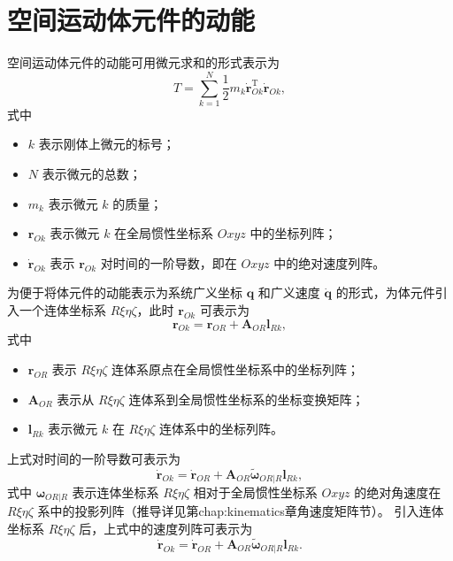 \section{空间运动体元件的动能}
空间运动体元件的动能可用微元求和的形式表示为
\[
T = \sum_{k=1}^{N} \frac{1}{2} m_k \dot{\boldsymbol{r}}_{Ok}^{\mathrm{T}} \dot{\boldsymbol{r}}_{Ok},
\]
式中
\begin{itemize}

\item $k$ 表示刚体上微元的标号；

\item $N$ 表示微元的总数；

\item $m_k$ 表示微元 $k$ 的质量；

\item $\boldsymbol{r}_{Ok}$ 表示微元 $k$ 在全局惯性坐标系 $Oxyz$ 中的坐标列阵；

\item $\dot{\boldsymbol{r}}_{Ok}$ 表示 $\boldsymbol{r}_{Ok}$ 对时间的一阶导数，即在 $Oxyz$ 中的绝对速度列阵。

\end{itemize}
为便于将体元件的动能表示为系统广义坐标 $\boldsymbol{q}$ 和广义速度 $\dot{\boldsymbol{q}}$ 的形式，为体元件引入一个连体坐标系 $R\xi\eta\zeta$，此时 $\boldsymbol{r}_{Ok}$ 可表示为
\[
\boldsymbol{r}_{Ok} = \boldsymbol{r}_{OR} + \boldsymbol{A}_{OR} \boldsymbol{l}_{Rk},
\]
式中
\begin{itemize}

\item $\boldsymbol{r}_{OR}$ 表示 $R\xi\eta\zeta$ 连体系原点在全局惯性坐标系中的坐标列阵；

\item $\boldsymbol{A}_{OR}$ 表示从 $R\xi\eta\zeta$ 连体系到全局惯性坐标系的坐标变换矩阵；

\item $\boldsymbol{l}_{Rk}$ 表示微元 $k$ 在 $R\xi\eta\zeta$ 连体系中的坐标列阵。

\end{itemize}
上式对时间的一阶导数可表示为
\[
\dot{\boldsymbol{r}}_{Ok} = \dot{\boldsymbol{r}}_{OR} + \boldsymbol{A}_{OR} \tilde{\boldsymbol{\omega}}_{OR|R} \boldsymbol{l}_{Rk},
\]
式中 $\boldsymbol{\omega}_{OR|R}$ 表示连体坐标系 $R\xi\eta\zeta$ 相对于全局惯性坐标系 $Oxyz$ 的绝对角速度在 $R\xi\eta\zeta$ 系中的投影列阵（推导详见第chap:kinematics章角速度矩阵节）。
引入连体坐标系 $R\xi\eta\zeta$ 后，上式中的速度列阵可表示为
\[
\dot{\boldsymbol{r}}_{Ok} = \dot{\boldsymbol{r}}_{OR} + \boldsymbol{A}_{OR} \tilde{\boldsymbol{\omega}}_{OR|R} \boldsymbol{l}_{Rk}.
\]
